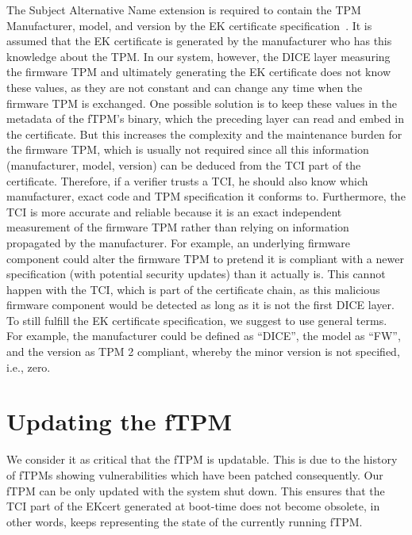 The Subject Alternative Name extension is required to contain the TPM Manufacturer, model, and version by the EK certificate specification~\cite{tcg-ek}.
It is assumed that the EK certificate is generated by the manufacturer who has this knowledge about the TPM\@.
In our system, however, the DICE layer measuring the firmware TPM and ultimately generating the EK certificate does not know these values, as they are not constant and can change any time when the firmware TPM is exchanged.
One possible solution is to keep these values in the metadata of the fTPM's binary, which the preceding layer can read and embed in the certificate.
But this increases the complexity and the maintenance burden for the firmware TPM, which is usually not required since all this information (manufacturer, model, version) can be deduced from the TCI part of the certificate.
Therefore, if a verifier trusts a TCI, he should also know which manufacturer, exact code and TPM specification it conforms to.
Furthermore, the TCI is more accurate and reliable because it is an exact independent measurement of the firmware TPM rather than relying on information propagated by the manufacturer.
For example, an underlying firmware component could alter the firmware TPM to pretend it is compliant with a newer specification (with potential security updates) than it actually is.
This cannot happen with the TCI, which is part of the certificate chain, as this malicious firmware component would be detected as long as it is not the first DICE layer.
To still fulfill the EK certificate specification, we suggest to use general terms.
For example, the manufacturer could be defined as ``DICE'', the model as ``FW'', and the version as TPM 2 compliant, whereby the minor version is not specified, i.e., zero.


\section{Updating the fTPM}


We consider it as critical that the \ac{fTPM} is updatable. This is due to the history of \acp{fTPM} showing vulnerabilities which have been patched consequently.
Our \ac{fTPM} can be only updated with the system shut down.
This ensures that the TCI part of the EKcert generated at boot-time does not become obsolete, in other words, keeps representing the state of the currently running fTPM\@.

